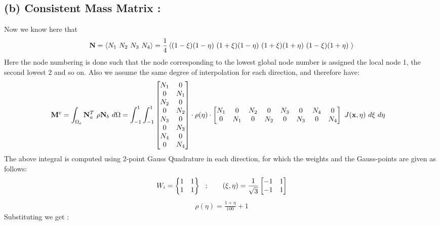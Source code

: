\subsection*{(b) Consistent Mass Matrix :}
Now we know here that
\begin{align*}
{\bf N}
=
\left< 
N_1 \ N_2 \ N_3 \ N_4 
\right> = 
\frac{1}{4}
\left< 
(1-\xi)(1-\eta)\ (1+\xi)(1-\eta)\ (1+\xi)(1+\eta)\ (1-\xi)(1+\eta)\ 
\right>
\end{align*}
Here the node numbering is done such that the node corresponding to the lowest global node number is assigned the local node 1, the second lowest 2 and so on. Also we assume the same degree of interpolation for each direction, and therefore have: 
\begin{align*}
{\bf M}^e
& =
\int_{\Omega_e}
{\bf N}^T_a\ \rho {\bf N}_b\ d\Omega = 
\int_{-1}^1 \int_{-1}^1
\begin{bmatrix}
N_1 & 0 \\
0 & N_1 \\
N_2 & 0 \\
0 & N_2 \\
N_3 & 0 \\
0 & N_3 \\
N_4 & 0 \\
0 & N_4 
\end{bmatrix}\cdot \rho (\eta) \cdot
\begin{bmatrix}
N_1 & 0 & N_2 & 0 & N_3 & 0 & N_4 & 0 \\
0 & N_1 & 0 & N_2 & 0 & N_3 & 0 & N_4  
\end{bmatrix}\ J({\bf x},{\bf\eta})\ d\xi\ d\eta
\end{align*}
The above integral is computed using 2-point Gauss Quadrature in each direction, for which the weights and the Gauss-points are given as follows: 
\begin{align*}
W_i = \begin{Bmatrix}
1 & 1 \\ 1& 1
\end{Bmatrix} \ \ ; \ \ \ \ \ \ 
({\bf \xi,\eta}) = \frac{1}{\sqrt{3}}
\begin{bmatrix}
-1 & 1\\ -1 & 1 
\end{bmatrix} 
\end{align*}
\begin{align*}
\rho (\eta) =
\frac{1+\eta}{100} +1
\end{align*}
Substituting we get : 
